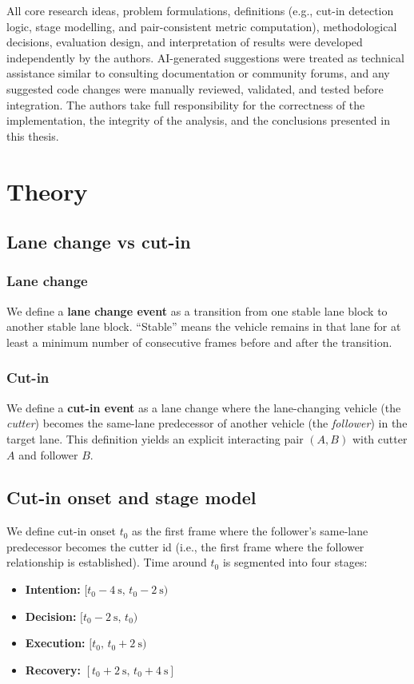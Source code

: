 \documentclass[12pt,a4paper,twoside,openright]{report}
\begin{document}
    All core research ideas, problem formulations, definitions (e.g., cut-in detection logic, stage modelling, and pair-consistent metric computation), methodological decisions, evaluation design, and interpretation of results were developed independently by the authors. AI-generated suggestions were treated as technical assistance similar to consulting documentation or community forums, and any suggested code changes were manually reviewed, validated, and tested before integration. The authors take full responsibility for the correctness of the implementation, the integrity of the analysis, and the conclusions presented in this thesis.

    \chapter{Theory}
    \label{chap:theory}

    \section{Lane change vs cut-in}
    \subsection{Lane change}
    We define a \textbf{lane change event} as a transition from one stable lane block to another stable lane block. ``Stable'' means the vehicle remains in that lane for at least a minimum number of consecutive frames before and after the transition.

    \subsection{Cut-in}
    We define a \textbf{cut-in event} as a lane change where the lane-changing vehicle (the \emph{cutter}) becomes the same-lane predecessor of another vehicle (the \emph{follower}) in the target lane. This definition yields an explicit interacting pair $(A,B)$ with cutter $A$ and follower $B$.

    \section{Cut-in onset and stage model}
    We define cut-in onset $t_0$ as the first frame where the follower's same-lane predecessor becomes the cutter id (i.e., the first frame where the follower relationship is established). Time around $t_0$ is segmented into four stages:
    \begin{itemize}[leftmargin=1.2em]
  \item \textbf{Intention:} $[t_0-\SI{4}{\second},\, t_0-\SI{2}{\second})$
  \item \textbf{Decision:} $[t_0-\SI{2}{\second},\, t_0)$
  \item \textbf{Execution:} $[t_0,\, t_0+\SI{2}{\second})$
  \item \textbf{Recovery:} $[t_0+\SI{2}{\second},\, t_0+\SI{4}{\second}]$
    \end{itemize}
\end{document}
